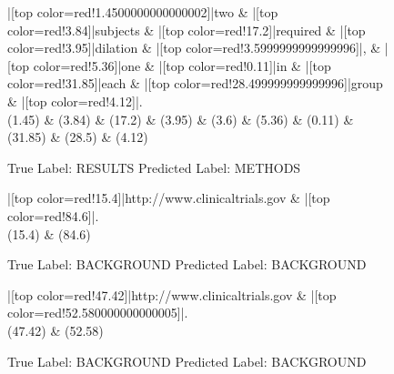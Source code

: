 \documentclass[a4paper, landscape]{article}
\begin{document}
\clearpage
\begin{figure}
\begin{center}
\begin{dependency}
\begin{deptext}
|[top color=red!1.4500000000000002]|two \& |[top color=red!3.84]|subjects \& |[top color=red!17.2]|required \& |[top color=red!3.95]|dilation \& |[top color=red!3.5999999999999996]|, \& |[top color=red!5.36]|one \& |[top color=red!0.11]|in \& |[top color=red!31.85]|each \& |[top color=red!28.499999999999996]|group \& |[top color=red!4.12]|.\\
(1.45) \& (3.84) \& (17.2) \& (3.95) \& (3.6) \& (5.36) \& (0.11) \& (31.85) \& (28.5) \& (4.12)\\
\end{deptext}
\end{dependency}
\end{center}
\caption{True Label: RESULTS Predicted Label: METHODS}
\end{figure}
\clearpage
\begin{figure}
\begin{center}
\begin{dependency}
\begin{deptext}
|[top color=red!15.4]|http://www.clinicaltrials.gov \& |[top color=red!84.6]|.\\
(15.4) \& (84.6)\\
\end{deptext}
\end{dependency}
\end{center}
\caption{True Label: BACKGROUND Predicted Label: BACKGROUND}
\end{figure}
\clearpage
\begin{figure}
\begin{center}
\begin{dependency}
\begin{deptext}
|[top color=red!47.42]|http://www.clinicaltrials.gov \& |[top color=red!52.580000000000005]|.\\
(47.42) \& (52.58)\\
\end{deptext}
\end{dependency}
\end{center}
\caption{True Label: BACKGROUND Predicted Label: BACKGROUND}
\end{figure}
\end{document}
